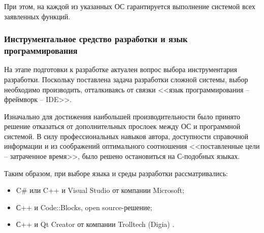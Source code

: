 При этом, на каждой из указанных ОС гарантируется выполнение системой всех заявленных функций.

\subsubsection{Инструментальное средство разработки и язык программирования}
На этапе подготовки к разработке актуален вопрос выбора инструментария разработки.
Поскольку поставлена задача разработки сложной системы, выбор необходимо производить, отталкиваясь от связки <<язык программирования -- фреймворк -- IDE>>.

Изначально для достижения наибольшей производительности было принято решение отказаться от дополнительных прослоек между ОС и программной системой.
В силу профессиональных навыков автора, доступности справочной информации и из соображений оптимального соотношения <<поставленные цели -- затраченное время>>, было решено остановиться на С-подобных языках.

Таким образом, при выборе языка и среды разработки рассматривались:
\begin{itemize}
  \item C\# или C++ и Visual Studio от компании Microsoft;
  \item С++ и Code::Blocks, open source-решение;
  \item С++ и Qt Creator от компании Trolltech (Digia) \cite{about-qt}.
\end{itemize}

